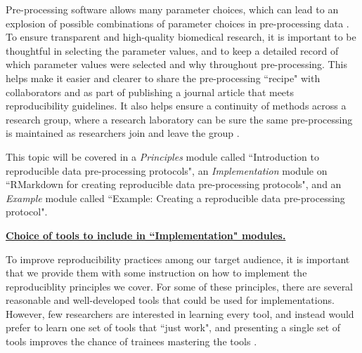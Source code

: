\documentclass[pdftex,english,11pt,parskip=half]{scrartcl}
\begin{document}
Pre-processing software allows many parameter choices, which can lead to an explosion of possible combinations of parameter choices in pre-processing data \cite{munafo2017manifesto, shade2015computing, pernet2015improving}. To ensure transparent and high-quality biomedical research, it is important to be thoughtful in selecting the parameter values, and to keep a detailed record of which parameter values were selected and why throughout pre-processing. This helps make it easier and clearer to share the pre-processing ``recipe" with collaborators and as part of publishing a journal article that meets reproducibility guidelines. It also helps ensure a continuity of methods across a research group, where a research laboratory can be sure the same pre-processing is maintained as researchers join and leave the group \cite{shade2015computing}.

This topic will be covered in a \textit{Principles} module called ``Introduction to reproducible data pre-processing protocols", an \textit{Implementation} module on ``RMarkdown
for creating reproducible data pre-processing protocols", and an
\textit{Example} module called ``Example: Creating a reproducible data
pre-processing protocol". 

\underline{\textbf{Choice of tools to include in ``Implementation" modules.}}

To improve reproducibility practices among our target audience, it is important
that we provide them with some instruction on how to implement the
reproduciblity principles we cover. For some of these principles, there are
several reasonable and well-developed tools that could be used for
implementations. However, few researchers are interested in learning every tool,
and instead would prefer to learn one set of tools that ``just work", and presenting a single set of tools improves the chance of trainees mastering the tools \cite{brown2018ten}.
\end{document}
